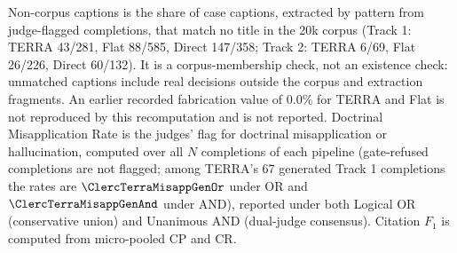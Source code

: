 \begin{table}[!t]
Non-corpus captions is the share of case captions, extracted by pattern from judge-flagged completions, that match no title in the 20k corpus (Track 1: TERRA 43/281, Flat 88/585, Direct 147/358; Track 2: TERRA 6/69, Flat 26/226, Direct 60/132). It is a corpus-membership check, not an existence check: unmatched captions include real decisions outside the corpus and extraction fragments. An earlier recorded fabrication value of 0.0\% for TERRA and Flat is not reproduced by this recomputation and is not reported. Doctrinal Misapplication Rate is the judges' flag for doctrinal misapplication or hallucination, computed over all $N$ completions of each pipeline (gate-refused completions are not flagged; among TERRA's 67 generated Track 1 completions the rates are $\ClercTerraMisappGenOr$ under OR and $\ClercTerraMisappGenAnd$ under AND), reported under both Logical OR (conservative union) and Unanimous AND (dual-judge consensus). Citation $F_1$ is computed from micro-pooled CP and CR.
\end{table}
